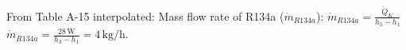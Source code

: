 From Table A-15 interpolated:  
Mass flow rate of R134a (\( \dot{m}_{R134a} \)):  
\( \dot{m}_{R134a} = \frac{\dot{Q}_K}{h_3 - h_1} \)  
\( \dot{m}_{R134a} = \frac{28 \, \text{W}}{h_3 - h_1} = 4 \, \text{kg/h} \).